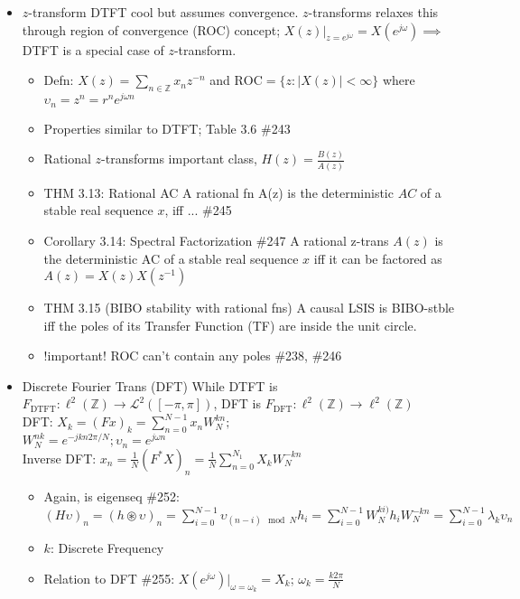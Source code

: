 \documentclass{article}
\newcommand{\cg}{\color{gray}}
\newcommand{\fs}{\footnotesize}
\begin{document}
\begin{itemize}
\begin{itemize}
\end{itemize}
\item $z$-transform {\cg DTFT cool but assumes convergence. $z$-transforms relaxes this through region of convergence (ROC) concept; $X(z)|_{z=e^{j\omega}}=X(e^{j\omega}) \implies $ DTFT is a special case of $z$-transform. }
\begin{itemize}
	\item Defn: {\cg $X(z) = \sum_{n\in\mathbb{Z}}x_nz^{-n}$ and $\text{ROC} = \{z:|X(z)|< \infty \}$ where $\upsilon_n=z^n=r^{n}e^{j\omega n}$}
	\item Properties similar to DTFT; Table 3.6 \#243
	\item Rational $z$-transforms {\cg important class, $H(z)=\frac{B(z)}{A(z)}$}
	\item THM 3.13: Rational AC {\cg A rational fn A(z) is the deterministic $AC$ of a stable real sequence $x$, iff ... \#245}
	\item Corollary 3.14: Spectral Factorization \#247 {\cg A rational z-trans $A(z)$ is the deterministic AC of a stable real sequence $x$ iff it can be factored as $A(z)=X(z)X(z^{-1})$}
	\item THM 3.15 (BIBO stability with rational fns) {\cg A causal LSIS is BIBO-stble iff the poles of its Transfer Function (TF) are} inside the unit circle.
	\item !important! ROC can't contain any poles \#238, \#246
\end{itemize}
	\item Discrete Fourier Trans (DFT) {\cg While DTFT is $F_{\text{DTFT}}:\ell^2(\mathbb{Z})\rightarrow \mathcal{L}^2([-\pi,\pi])$, DFT is $F_{\text{DFT}}:\ell^2(\mathbb{Z})\rightarrow\ell^2(\mathbb{Z})$ }\\
	{\cg\fs
	DFT: $X_k = (Fx)_k = \sum\limits_{n=0}^{N-1}x_nW_N^{kn};$\\
	$W_N^{nk}=e^{-j kn 2\pi/N}; \upsilon_n=e^{j\omega n}$ \\
	Inverse DFT: $x_n = \frac{1}{N}(F^{*}X)_n =\frac{1}{N}\sum\limits_{n=0}^{N_1}X_k W_N^{-kn}$ 
	}
	\begin{itemize}
		\item Again, is eigenseq \#252: {\cg$(H\upsilon)_n=(h\circledast \upsilon)_n=\sum\limits_{i=0}^{N-1}\upsilon_{(n-i)\mod N}h_i =\sum\limits_{i=0}^{N-1}W_N^{ki)}h_iW_N^{-kn}=\sum\limits_{i=0}^{N-1}\lambda_k \upsilon_n$}
		\item $k$: Discrete Frequency
		\item Relation to DFT \#255: {\cg $X(e^{j\omega})|_{\omega=\omega_k}=X_k$; $\omega_k=\frac{k2\pi}{N}$}

\end{itemize}
\end{itemize}
\end{document}
